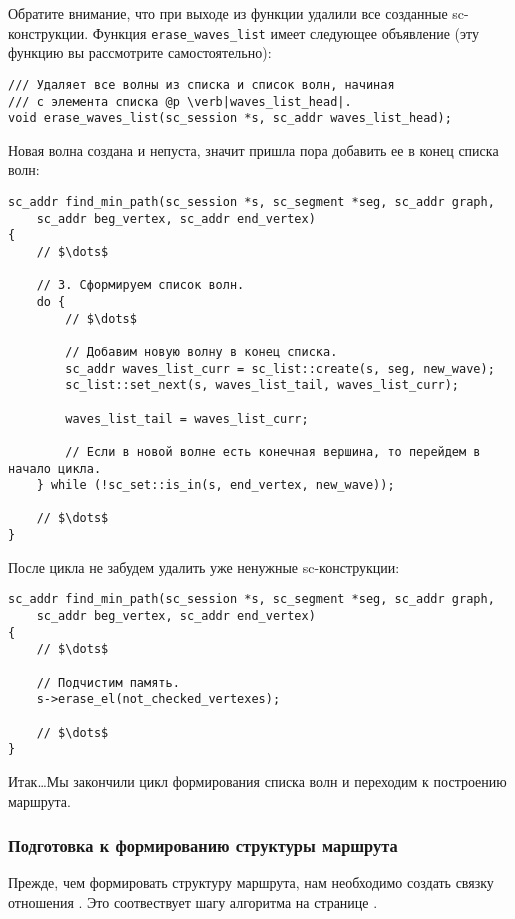 Обратите внимание, что при выходе из функции удалили все созданные
sc-конструкции. Функция \lstinline|erase_waves_list| имеет следующее
объявление (эту функцию вы рассмотрите самостоятельно):
\begin{lstlisting}[texcl]
/// Удаляет все волны из списка и список волн, начиная
/// с элемента списка @p \verb|waves_list_head|.
void erase_waves_list(sc_session *s, sc_addr waves_list_head);
\end{lstlisting}

Новая волна создана и непуста, значит пришла пора добавить ее в конец
списка волн:
\begin{lstlisting}[texcl]
sc_addr find_min_path(sc_session *s, sc_segment *seg, sc_addr graph,
    sc_addr beg_vertex, sc_addr end_vertex)
{
    // $\dots$

    // 3. Сформируем список волн.
    do {
        // $\dots$

        // Добавим новую волну в конец списка.
        sc_addr waves_list_curr = sc_list::create(s, seg, new_wave);
        sc_list::set_next(s, waves_list_tail, waves_list_curr);

        waves_list_tail = waves_list_curr;

        // Если в новой волне есть конечная вершина, то перейдем в начало цикла.
    } while (!sc_set::is_in(s, end_vertex, new_wave));

    // $\dots$
}
\end{lstlisting}

После цикла не забудем удалить уже ненужные sc-конструкции:
\begin{lstlisting}[texcl]
sc_addr find_min_path(sc_session *s, sc_segment *seg, sc_addr graph,
    sc_addr beg_vertex, sc_addr end_vertex)
{
    // $\dots$

    // Подчистим память.
    s->erase_el(not_checked_vertexes);

    // $\dots$
}
\end{lstlisting}

Итак\dots Мы закончили цикл формирования списка волн и переходим к
построению маршрута.

\subsubsection{Подготовка к формированию структуры маршрута}
\label{sec:libscprg_fmp_before_build_route}

Прежде, чем формировать структуру маршрута, нам необходимо создать
связку отношения . Это соотвествует шагу алгоритма
на странице \pageref{astep:S8_Create_route_tuple}.

